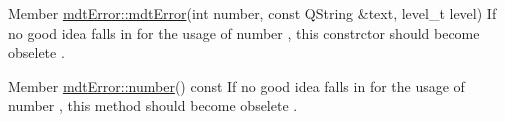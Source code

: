 \label{deprecated__deprecated000001}
\hypertarget{deprecated__deprecated000001}{}
 
\begin{DoxyDescription}
\item[Member \hyperlink{classmdt_error_a377c175cc8e1aeae543cae2ecc5ca87b}{mdtError::mdtError}(int number, const QString \&text, level\_\-t level) ]If no good idea falls in for the usage of number , this constrctor should become obselete . 
\end{DoxyDescription}

\label{deprecated__deprecated000002}
\hypertarget{deprecated__deprecated000002}{}
 
\begin{DoxyDescription}
\item[Member \hyperlink{classmdt_error_ad233adb8efe4180b85f584c5afdd49fc}{mdtError::number}() const  ]If no good idea falls in for the usage of number , this method should become obselete . 
\end{DoxyDescription}